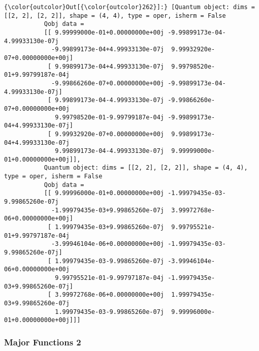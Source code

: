 \documentclass[11pt]{article}
\begin{document}
\begin{Verbatim}[commandchars=\\\{\}]
{\color{outcolor}Out[{\color{outcolor}262}]:} [Quantum object: dims = [[2, 2], [2, 2]], shape = (4, 4), type = oper, isherm = False
           Qobj data =
           [[ 9.99999000e-01+0.00000000e+00j -9.99899173e-04-4.99933130e-07j
             -9.99899173e-04+4.99933130e-07j  9.99932920e-07+0.00000000e+00j]
            [ 9.99899173e-04+4.99933130e-07j  9.99798520e-01+9.99799187e-04j
             -9.99866260e-07+0.00000000e+00j -9.99899173e-04-4.99933130e-07j]
            [ 9.99899173e-04-4.99933130e-07j -9.99866260e-07+0.00000000e+00j
              9.99798520e-01-9.99799187e-04j -9.99899173e-04+4.99933130e-07j]
            [ 9.99932920e-07+0.00000000e+00j  9.99899173e-04+4.99933130e-07j
              9.99899173e-04-4.99933130e-07j  9.99999000e-01+0.00000000e+00j]],
           Quantum object: dims = [[2, 2], [2, 2]], shape = (4, 4), type = oper, isherm = False
           Qobj data =
           [[ 9.99996000e-01+0.00000000e+00j -1.99979435e-03-9.99865260e-07j
             -1.99979435e-03+9.99865260e-07j  3.99972768e-06+0.00000000e+00j]
            [ 1.99979435e-03+9.99865260e-07j  9.99795521e-01+9.99797187e-04j
             -3.99946104e-06+0.00000000e+00j -1.99979435e-03-9.99865260e-07j]
            [ 1.99979435e-03-9.99865260e-07j -3.99946104e-06+0.00000000e+00j
              9.99795521e-01-9.99797187e-04j -1.99979435e-03+9.99865260e-07j]
            [ 3.99972768e-06+0.00000000e+00j  1.99979435e-03+9.99865260e-07j
              1.99979435e-03-9.99865260e-07j  9.99996000e-01+0.00000000e+00j]]]
\end{Verbatim}
            
    \subsubsection{Major Functions 2}\label{major-functions-2}
\end{document}
